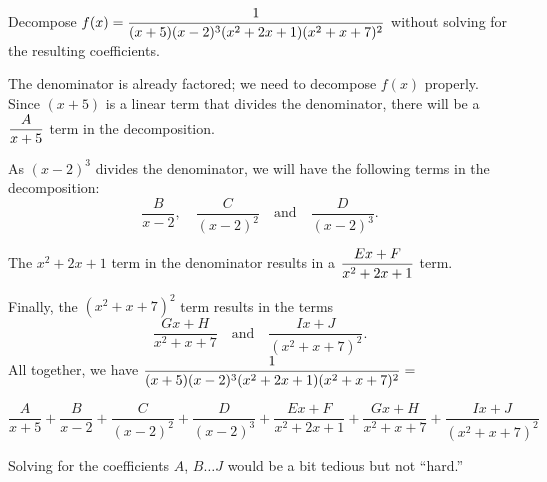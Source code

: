 \begin{example} \label{eg:5.4.5} %
Decompose $\displaystyle f(x)=\frac{1}{(x+5)(x-2)^3(x^2+2x+1)(x^2+x+7)^2}$ without solving for the resulting coefficients.

\solution
The denominator is already factored; we need to decompose $f(x)$ properly. Since $(x+5)$ is a linear term that divides the denominator, there will be a $\displaystyle\frac{A}{x+5}$ term in the decomposition.

As $(x-2)^3$ divides the denominator, we will have the following terms in the decomposition:
$$\frac{B}{x-2},\quad \frac{C}{(x-2)^2}\quad \text{and}\quad \frac{D}{(x-2)^3}.$$

The $x^2+2x+1$ term in the denominator results in a $\displaystyle\frac{Ex+F}{x^2+2x+1}$ term.

Finally, the $(x^2+x+7)^2$ term results in the terms $$\frac{Gx+H}{x^2+x+7}\quad \text{and}\quad \frac{Ix+J}{(x^2+x+7)^2}.$$
All together, we have $\displaystyle \frac{1}{(x+5)(x-2)^3(x^2+2x+1)(x^2+x+7)^2} =$\footnotesize

\[ \frac{A}{x+5} + \frac{B}{x-2}+ \frac{C}{(x-2)^2}+\frac{D}{(x-2)^3}+ \frac{Ex+F}{x^2+2x+1}+ \frac{Gx+H}{x^2+x+7}+\frac{Ix+J}{(x^2+x+7)^2}\]\small

Solving for the coefficients $A$, $B \ldots J$ would be a bit tedious but not ``hard.''

\end{example}
